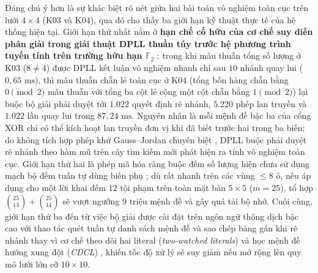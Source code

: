 Đáng chú ý hơn là sự khác biệt rõ nét giữa hai bài toán vô nghiệm toàn cục trên
lưới $4 \times 4$ ($\text{K03}$ và $\text{K04}$), qua đó cho thấy ba giới hạn kỹ
thuật thực tế của hệ thống hiện tại. Giới hạn thứ nhất nằm ở \textbf{hạn chế cố hữu
của cơ chế suy diễn phân giải trong giải thuật DPLL thuần túy trước hệ phương trình
tuyến tính trên trường hữu hạn $\mathbb{F}_2$}
\cite{tseitin1983complexity,urquhart1987hard}: trong khi mâu thuẫn tổng số lượng ở
$\text{K03}$ ($8 \ne 4$) được DPLL kết luận vô nghiệm nhanh chỉ sau $10$ nhánh
quay lui ($0{,}65\text{ ms}$), thì mâu thuẫn chẵn lẻ toàn cục ở $\text{K04}$ (tổng bốn hàng
chẵn bằng $0 \pmod 2$ mâu thuẫn với tổng ba cột lẻ cộng một cột chẵn bằng
$1 \pmod 2$) lại buộc bộ giải phải duyệt tới $1.022$ quyết định rẽ nhánh, $5.220$
phép lan truyền và $1.022$ lần quay lui trong $87{,}24\text{ ms}$. Nguyên nhân là
mỗi mệnh đề bậc ba của cổng XOR chỉ có thể kích hoạt lan truyền đơn vị khi đã biết
trước hai trong ba biến; do không tích hợp phép khử Gauss--Jordan chuyên biệt
\cite{soos2009extending}, DPLL buộc phải duyệt rẽ nhánh theo hàm mũ trên cây tìm
kiếm mới phát hiện ra tính vô nghiệm toàn cục. Giới hạn thứ hai là phép mã hóa ràng
buộc đếm số lượng hiện chưa sử dụng mạch bộ đếm tuần tự dùng biến phụ
\cite{sinz2005towards}; dù rất nhanh trên các vùng $\le 8$ ô, nếu áp dụng cho một
lời khai đếm $12$ tội phạm trên toàn mặt bàn $5 \times 5$ ($m = 25$), tổ hợp
$\binom{25}{13} + \binom{25}{14}$ sẽ vượt ngưỡng $9$ triệu mệnh đề và gây quá tải
bộ nhớ. Cuối cùng, giới hạn thứ ba đến từ việc bộ giải được cài đặt trên ngôn ngữ
thông dịch bậc cao với thao tác quét tuần tự danh sách mệnh đề và sao chép bảng gán
khi rẽ nhánh thay vì cơ chế theo dõi hai literal (\textit{two-watched literals}) và
học mệnh đề hướng xung đột (\textit{CDCL})
\cite{silva1999grasp,moskewicz2001chaff}, khiến tốc độ xử lý sẽ suy giảm nếu mở
rộng lên quy mô lưới lớn cỡ $10 \times 10$.
